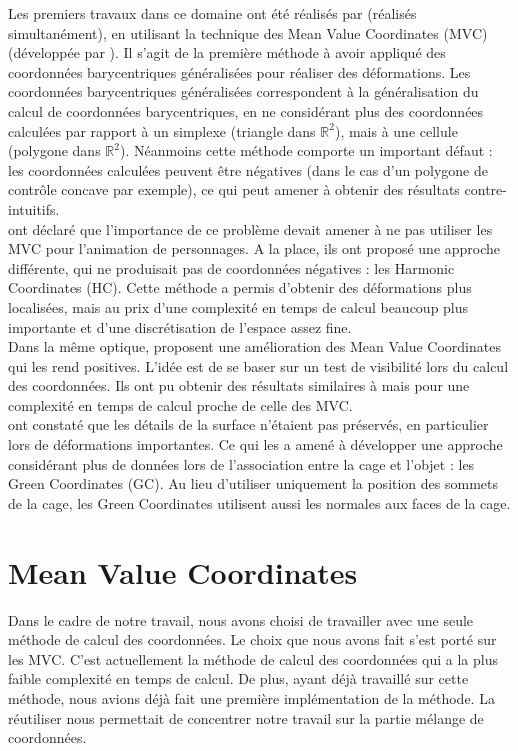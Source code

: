 Les premiers travaux dans ce domaine ont été réalisés par \cite{JSW05}
\cite{FKR05} (réalisés simultanément), en utilisant la technique des
Mean Value Coordinates (MVC) (développée par \cite{Flo03}). Il s'agit de la
première méthode à avoir appliqué des coordonnées barycentriques généralisées
pour réaliser des déformations. Les coordonnées barycentriques généralisées
correspondent à la généralisation du calcul de coordonnées barycentriques, en ne
considérant plus des coordonnées calculées par rapport à un simplexe (triangle
dans $\mathbb{R}^2$), mais à une cellule (polygone dans $\mathbb{R}^2$).
Néanmoins cette méthode comporte un important défaut : les coordonnées calculées
peuvent être négatives (dans le cas d'un polygone de contrôle concave par
exemple), ce qui peut amener à obtenir des résultats contre-intuitifs. \\

\cite{JMDGS07} ont déclaré que l'importance de ce problème devait amener à ne
pas utiliser les MVC pour l'animation de personnages. A la place, ils ont
proposé une approche différente, qui ne produisait pas de coordonnées négatives
: les Harmonic Coordinates (HC). Cette méthode a permis d'obtenir des
déformations plus localisées, mais au prix d'une complexité en temps de calcul
beaucoup plus importante et d'une discrétisation de l'espace assez fine. \\

Dans la même optique, \cite{LKCL07} proposent une amélioration des Mean Value
Coordinates qui les rend positives. L'idée est de se baser sur un test de
visibilité lors du calcul des coordonnées. Ils ont pu obtenir des résultats
similaires à \cite{JMDGS07} mais pour une complexité en temps de calcul proche
de celle des MVC. \\

\cite{LLC08} ont constaté que les détails de la surface n'étaient pas préservés,
en particulier lors de déformations importantes. Ce qui les a amené à développer
une approche considérant plus de données lors de l'association entre la cage et
l'objet : les Green Coordinates (GC). Au lieu d'utiliser uniquement la position
des sommets de la cage, les Green Coordinates utilisent aussi les normales aux
faces de la cage.

\section{Mean Value Coordinates}

Dans le cadre de notre travail, nous avons choisi de travailler avec une seule
méthode de calcul des coordonnées. Le choix que nous avons fait s'est porté sur
les MVC. C'est actuellement la méthode de calcul des coordonnées qui a la plus
faible complexité en temps de calcul. De plus, ayant déjà travaillé sur cette
méthode, nous avions déjà fait une première implémentation de la méthode. La
réutiliser nous permettait de concentrer notre travail sur la partie mélange de
coordonnées.

